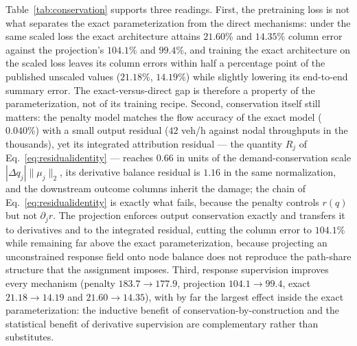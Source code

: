 Table~\ref{tab:conservation} supports three readings. First, the
pretraining loss is not what separates the exact parameterization from
the direct mechanisms: under the same scaled loss the exact
architecture attains $21.60\%$ and $14.35\%$ column error against the
projection's $104.1\%$ and $99.4\%$, and training the exact
architecture on the scaled loss leaves its column errors within half a
percentage point of the published unscaled values ($21.18\%$,
$14.19\%$) while slightly lowering its end-to-end summary error. The
exact-versus-direct gap is therefore a property of the
parameterization, not of its training recipe. Second, conservation
itself still matters: the penalty model matches the flow accuracy of
the exact model ($0.040\%$) with a small output residual ($42$ veh/h
against nodal throughputs in the thousands), yet its integrated
attribution residual --- the quantity $R_j$ of
Eq.~\eqref{eq:residualidentity} --- reaches $0.66$ in units of the
demand-conservation scale $|\Delta q_j|\|\mu_j\|_2$, its derivative
balance residual is $1.16$ in the same normalization, and the
downstream outcome columns inherit the damage; the chain of
Eq.~\eqref{eq:residualidentity} is exactly what fails, because the
penalty controls $r(q)$ but not $\partial_jr$. The projection enforces
output conservation exactly and transfers it to derivatives and to the
integrated residual, cutting the column error to $104.1\%$ while
remaining far above the exact parameterization, because projecting an
unconstrained response field onto node balance does not reproduce the
path-share structure that the assignment imposes. Third, response
supervision improves every mechanism (penalty $183.7\to177.9$,
projection $104.1\to99.4$, exact $21.18\to14.19$ and
$21.60\to14.35$), with by far the largest effect inside the exact
parameterization: the inductive benefit of
conservation-by-construction and the statistical benefit of derivative
supervision are complementary rather than substitutes.
